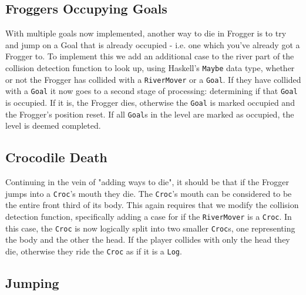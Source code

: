 \documentclass[12pt, a4paper]{report}
\begin{document}
\subsection{Froggers Occupying Goals}

With multiple goals now implemented, another way to die in Frogger is to try and jump on a Goal that is already occupied - i.e. one which you've already got a Frogger to.
To implement this we add an additional case to the river part of the collision detection function to look up, using Haskell's \verb|Maybe| data type, whether or not the Frogger has collided with a \verb|RiverMover| or a \verb|Goal|.
If they have collided with a \verb|Goal| it now goes to a second stage of processing: determining if that \verb|Goal| is occupied.
If it is, the Frogger dies, otherwise the \verb|Goal| is marked occupied and the Frogger's position reset.
If all \verb|Goal|s in the level are marked as occupied, the level is deemed completed.

\subsection{Crocodile Death}

Continuing in the vein of "adding ways to die", it should be that if the Frogger jumps into a \verb|Croc|'s mouth they die.
The \verb|Croc|'s mouth can be considered to be the entire front third of its body.
This again requires that we modify the collision detection function, specifically adding a case for if the \verb|RiverMover| is a \verb|Croc|.
In this case, the \verb|Croc| is now logically split into two smaller \verb|Croc|s, one representing the body and the other the head.
If the player collides with only the head they die, otherwise they ride the \verb|Croc| as if it is a \verb|Log|.

\subsection{Jumping}
\end{document}
